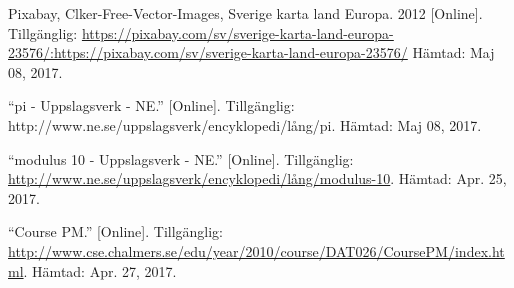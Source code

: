     Pixabay, Clker-Free-Vector-Images, Sverige karta land Europa. 2012 [Online]. Tillgänglig: \url{https://pixabay.com/sv/sverige-karta-land-europa-23576/:https://pixabay.com/sv/sverige-karta-land-europa-23576/} Hämtad: Maj 08, 2017.
    
    “pi - Uppslagsverk - NE.” [Online]. Tillgänglig: http://www.ne.se/uppslagsverk/encyklopedi/lång/pi. Hämtad: Maj 08, 2017.
    
    “modulus 10 - Uppslagsverk - NE.” [Online]. Tillgänglig: \url{http://www.ne.se/uppslagsverk/encyklopedi/lång/modulus-10}. 
    Hämtad: Apr. 25, 2017.
    
    “Course PM.” [Online]. Tillgänglig: \url{http://www.cse.chalmers.se/edu/year/2010/course/DAT026/CoursePM/index.html}. 
    Hämtad: Apr. 27, 2017.
    
    
    
    
    
    
    
    
    
    
    
    
   
   
   
    
    
    
    
    
    
     
     
    
    
    
    
    
    
    
    
    

    
    
    
    
    
    
    
    
    
    
    
    
